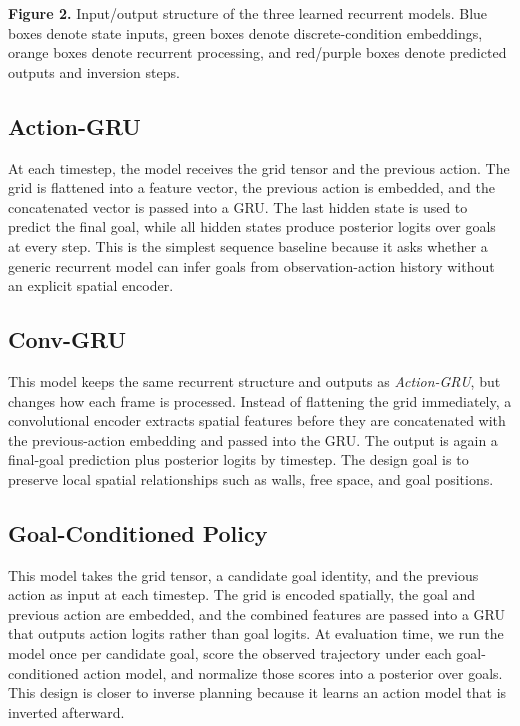 \documentclass[11pt]{article}
\begin{document}
\begin{center}
\vspace{0.25em}
{\footnotesize \textbf{Figure 2.} Input/output structure of the three learned
recurrent models. Blue boxes denote state inputs, green boxes denote
discrete-condition embeddings, orange boxes denote recurrent processing, and
red/purple boxes denote predicted outputs and inversion steps.}
\end{center}

\subsection{Action-GRU}
At each timestep, the model receives the grid tensor and the previous action.
The grid is flattened into a feature vector, the previous action is embedded,
and the concatenated vector is passed into a GRU. The last hidden state is used
to predict the final goal, while all hidden states produce posterior logits
over goals at every step. This is the simplest sequence baseline because it
asks whether a generic recurrent model can infer goals from observation-action
history without an explicit spatial encoder.

\subsection{Conv-GRU}
This model keeps the same recurrent structure and outputs as
\textit{Action-GRU},
but changes how each frame is processed. Instead of flattening the grid
immediately, a convolutional encoder extracts spatial features before they are
concatenated with the previous-action embedding and passed into the GRU. The
output is again a final-goal prediction plus posterior logits by timestep. The
design goal is to preserve local spatial relationships such as walls, free
space, and goal positions.

\subsection{Goal-Conditioned Policy}
This model takes the grid tensor, a candidate goal identity, and the previous
action as input at each timestep. The grid is encoded spatially, the goal and
previous action are embedded, and the combined features are passed into a GRU
that outputs action logits rather than goal logits. At evaluation time, we run
the model once per candidate goal, score the observed trajectory under each
goal-conditioned action model, and normalize those scores into a posterior over
goals. This design is closer to inverse planning because it learns an action
model that is inverted afterward.
\end{document}
